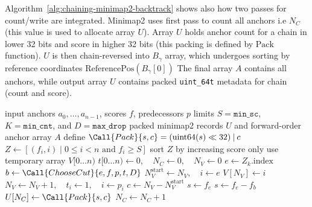 Algorithm~\ref{alg:chaining-minimap2-backtrack} shows also how two passes for count/write are integrated. Minimap2 uses first pass to count all anchors i.e $N_C$ (this value is used to allocate array $U$). Array $U$ holds anchor count for a chain in lower 32 bits and score in higher 32 bits (this packing is defined by $\text{Pack}$ function).
$U$ is then chain-reversed into $B_\gamma$ array, which undergoes sorting by reference coordinates $\text{ReferencePos}(B_\gamma[0])$
The final array $A$ contains all anchors, while output array $U$ contains packed \texttt{uint\_64t} metadata for chain (count and score).

\begin{algorithm}[H]
\caption{Minimap2 scalar backtracking and final chain order}
\label{alg:chaining-minimap2-backtrack}
\footnotesize
\begin{algorithmic}[1]
  \Require input anchors \(a_0,\ldots,a_{n-1}\), scores \(f\), predecessors \(p\)
  \Require limits \(S=\texttt{min\_sc}\),
           \(K=\texttt{min\_cnt}\), and \(D=\texttt{max\_drop}\)
  \Ensure packed minimap2 records \(U\) and forward-order anchor array \(A\)
  \State define
        \(\Call{Pack}{s,c}=(\operatorname{uint64}(s)\ll32)\mathbin{\vert}c\)
  \State \(Z\gets[(f_i,i)\mid 0\leq i<n\text{ and }f_i\geq S]\)
  \State sort \(Z\) by increasing score only
  \State use temporary array \(V[0\ldots n)\)
    \State \(t[0\ldots n)\gets0,\quad N_C\gets0,\quad N_V\gets0\)
      \State \(e\gets Z_k.\mathrm{index}\)
        \State \(b\gets\Call{ChooseCut}{e,f,p,t,D}\)
        \State \(N_V^{\mathrm{start}}\gets N_V,\quad i\gets e\)
            \State \(V[N_V]\gets i\)
          \EndIf
          \State \(N_V\gets N_V+1,\quad t_i\gets1,\quad i\gets p_i\)
        \EndWhile
        \State \(c\gets N_V-N_V^{\mathrm{start}}\)
          \State \(s\gets f_e\)
        \Else
          \State \(s\gets f_e-f_b\)
        \EndIf
            \State \(U[N_C]\gets\Call{Pack}{s,c}\)
          \EndIf
          \State \(N_C\gets N_C+1\)
        \Else

\end{algorithmic}
\end{algorithm}
